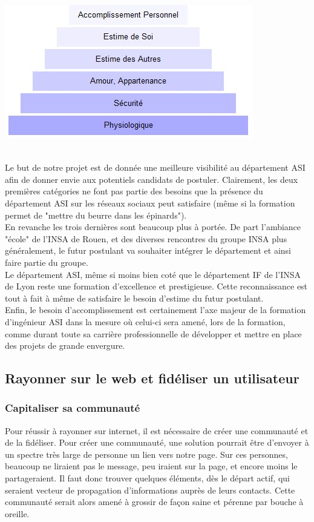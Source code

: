 \begin{center}
\includegraphics[scale=0.5]{./image/pyramidemaslow.jpg}
\end{center}
~~\\
\indent Le but de notre projet est de donnée une meilleure visibilité au département ASI afin de donner envie aux potentiels candidats de postuler. Clairement, les deux premières catégories ne font pas partie des besoins que la présence du département ASI sur les réseaux sociaux peut satisfaire (même si la formation permet de "mettre du beurre dans les épinards"). ~~\\
\indent En revanche les trois dernières sont beaucoup plus à portée. 
\indent De part l'ambiance "école" de l'INSA de Rouen, et des diverses rencontres du groupe INSA plus généralement, le futur postulant va souhaiter intégrer le département et ainsi faire partie du groupe. ~~\\
\indent Le département ASI, même si moins bien coté que le département IF de l'INSA de Lyon reste une formation d'excellence et prestigieuse. Cette reconnaissance est tout à fait à même de satisfaire le besoin d'estime du futur postulant. ~~\\
\indent Enfin, le besoin d'accomplissement est certainement l'axe majeur de la formation d'ingénieur ASI dans la mesure où celui-ci sera amené, lors de la formation, comme durant toute sa carrière professionnelle de développer et mettre en place des projets de grande envergure.

\subsection{Rayonner sur le web et fidéliser un utilisateur}
\subsubsection{Capitaliser sa communauté}
Pour réussir à rayonner sur internet, il est nécessaire de créer une communauté et de la fidéliser. Pour créer une communauté, une solution pourrait être d'envoyer à un spectre très large de personne un lien vers notre page. Sur ces personnes, beaucoup ne liraient pas le message, peu iraient sur la page, et encore moins le partageraient. Il faut donc trouver quelques éléments, dès le départ actif, qui seraient vecteur de propagation d'informations auprès de leurs contacts. Cette communauté serait alors amené à grossir de façon saine et pérenne par bouche à oreille.
